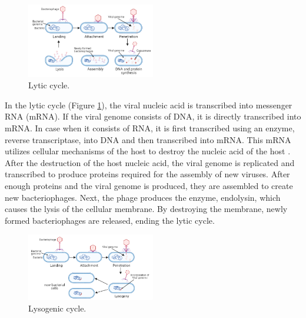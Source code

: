 \begin{figure}[h]
  \begin{center}
     \includegraphics[width=0.5\textwidth]{images/lytic.png}
     \caption{Lytic cycle.}\label{fig:lytic}
  \end{center}
\end{figure} 

In the lytic cycle (Figure \ref{fig:lytic}), the viral nucleic acid is transcribed into messenger RNA (mRNA). If the viral genome consists of DNA, it is directly transcribed into mRNA. In case when it consists of RNA, it is first transcribed using an enzyme, reverse transcriptase, into DNA and then transcribed into mRNA. This mRNA utilizes cellular mechanisms of the host to destroy the nucleic acid of the host \cite{guttman2005basic}. After the destruction of the host nucleic acid, the viral genome is replicated and transcribed to produce proteins required for the assembly of new viruses. After enough proteins and the viral genome is produced, they are assembled to create new bacteriophages. Next, the phage produces the enzyme, endolysin, which causes the lysis of the cellular membrane. By destroying the membrane, newly formed bacteriophages are released, ending the lytic cycle.

\begin{figure}[h]
  \begin{center}
     \includegraphics[width=0.5\textwidth]{images/lysogenic.png}
     \caption{Lysogenic cycle.}\label{fig:lysogenic}
  \end{center}
\end{figure} 

